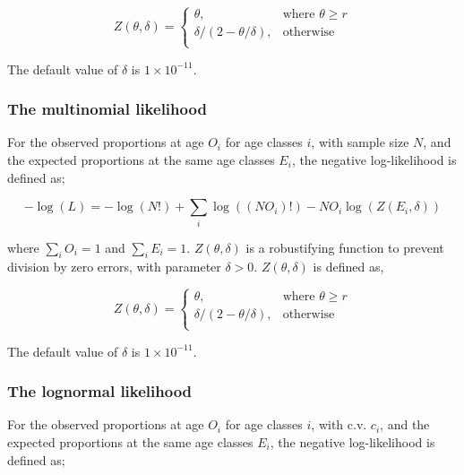 {{{{{{\begin{equation}
   Z \left(\theta,\delta \right) = \begin{cases}
	  \theta, & \text{where $\theta \ge r$} \\
	  \delta/\left( 2-\theta/\delta \right), & \text{otherwise} \\  
  \end{cases}
\end{equation}

The default value of $\delta$ is $1 \times 10^{-11}$.

\subsubsection*{The multinomial likelihood}

For the observed proportions at age $O_i$ for age classes $i$, with sample size $N$, and the expected proportions at the same age classes $E_i$, the negative log-likelihood is defined as; 

\begin{equation}
  -\log \left(L \right) =  -\log \left(N! \right) + \sum\limits_i \log \left( \left(NO_i \right)! \right) - NO_i \log \left(Z \left(E_i,\delta \right) \right)
\end{equation}

where $\sum\limits_i O_i = 1$ and $\sum\limits_i E_i = 1$. $Z \left(\theta,\delta \right)$ is a robustifying function to prevent division by zero errors, with parameter $\delta>0$. $Z \left(\theta,\delta \right)$ is defined as,

\begin{equation}
   Z \left(\theta,\delta \right) = \begin{cases}
	  \theta, & \text{where $\theta \ge r$} \\
	  \delta/\left( 2-\theta/\delta \right), & \text{otherwise} \\  
  \end{cases}
\end{equation}

The default value of $\delta$ is $1 \times 10^{-11}$.

\subsubsection*{The lognormal likelihood}

For the observed proportions at age $O_i$ for age classes $i$, with c.v. $c_i$, and the expected proportions at the same age classes $E_i$, the negative log-likelihood is defined as; 

}}}}}}
